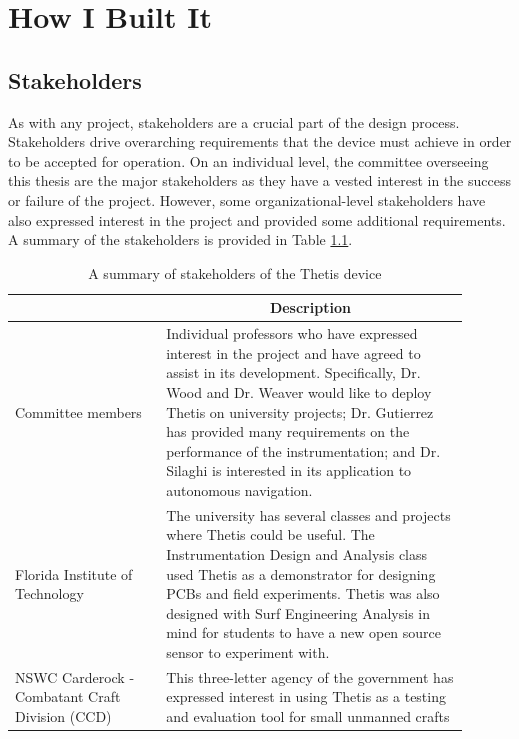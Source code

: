 \chapter{How I Built It} \label{chap:thetis_design}

\section{Stakeholders} \label{sec:stakeholders}
As with any project, stakeholders are a crucial part of the design process.
Stakeholders drive overarching requirements that the device must achieve in order to be accepted for operation.
On an individual level, the committee overseeing this thesis are the major stakeholders as they have a vested interest in the success or failure of the project.
However, some organizational-level stakeholders have also expressed interest in the project and provided some additional requirements.
A summary of the stakeholders is provided in Table \ref{tab:stakeholders}.

\begin{table}
	\caption{A summary of stakeholders of the Thetis device}
	\label{tab:stakeholders}
	\centering
	\begin{tabular}{|p{0.3\linewidth} | p{0.6\linewidth}|}
		\hline
		\rowcolor[gray]{0.8}
		\multicolumn{1}{|c|}{\textbf{Stakeholder}} & \multicolumn{1}{|c|}{\textbf{Description}} \\
		\hline
		Committee members & Individual professors who have expressed interest in the project and have agreed to assist in its development. Specifically, Dr. Wood and Dr. Weaver would like to deploy Thetis on university projects; Dr. Gutierrez has provided many requirements on the performance of the instrumentation; and Dr. Silaghi is interested in its application to autonomous navigation. \\
		\hline
		Florida Institute of \newline Technology & The university has several classes and projects where Thetis could be useful. The Instrumentation Design and Analysis class used Thetis as a demonstrator for designing PCBs and field experiments. Thetis was also designed with Surf Engineering Analysis in mind for students to have a new open source sensor to experiment with. \\
		\hline
		NSWC Carderock - \newline Combatant Craft Division (CCD) & This three-letter agency of the government has expressed interest in using Thetis as a testing and evaluation tool for small unmanned crafts \\
		\hline
	\end{tabular}
\end{table}

